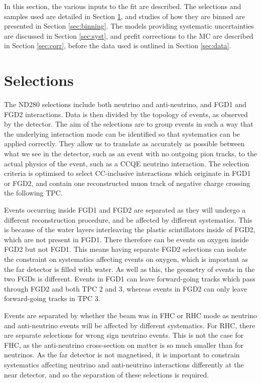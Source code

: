 In this section, the various inputs to the fit are described. The selections and samples used are detailed in Section \ref{sec:sel}, and studies of how they are binned are presented in Section \ref{sec:binning}. The models providing systematic uncertainties are discussed in Section \ref{sec:syst}, and prefit corrections to the MC are described in Section \ref{sec:corr}, before the data used is outlined in Section \ref{sec:data}.

\section{Selections}\label{sec:sel}

The ND280 selections include both neutrino and anti-neutrino, and FGD1 and FGD2 interactions. Data is then divided by the topology of events, as observed by the detector. The aim of the selections are to group events in such a way that the underlying interaction mode can be identified so that systematics can be applied correctly. They allow us to translate as accurately as possible between what we see in the detector, such as an event with no outgoing pion tracks, to the actual physics of the event, such as a CCQE neutrino interaction. The selection criteria is optimised to select CC-inclusive interactions which originate in FGD1 or FGD2, and contain one reconstructed muon track of negative charge crossing the following TPC.

Events occurring inside FGD1 and FGD2 are separated as they will undergo a different reconstruction procedure, and be affected by different systematics. This is because of the water layers interleaving the plastic scintillators inside of FGD2, which are not present in FGD1. There therefore can be events on oxygen inside FGD2 but not FGD1. This means having separate FGD2 selections can isolate the constraint on systematics affecting events on oxygen, which is important as the far detector is filled with water. As well as this, the geometry of events in the two FGDs is different. Events in FGD1 can leave forward-going tracks which pass through FGD2 and both TPC 2 and 3, whereas events in FGD2 can only leave forward-going tracks in TPC 3.

Events are separated by whether the beam was in FHC or RHC mode as neutrino and anti-neutrino events will be affected by different systematics. For RHC, there are separate selections for wrong sign neutrino events. This is not the case for FHC, as the anti-neutrino cross-section on matter is so much smaller than for neutrinos. As the far detector is not magnetised, it is important to constrain systematics affecting neutrino and anti-neutrino interactions differently at the near detector, and so the separation of these selections is required. 

